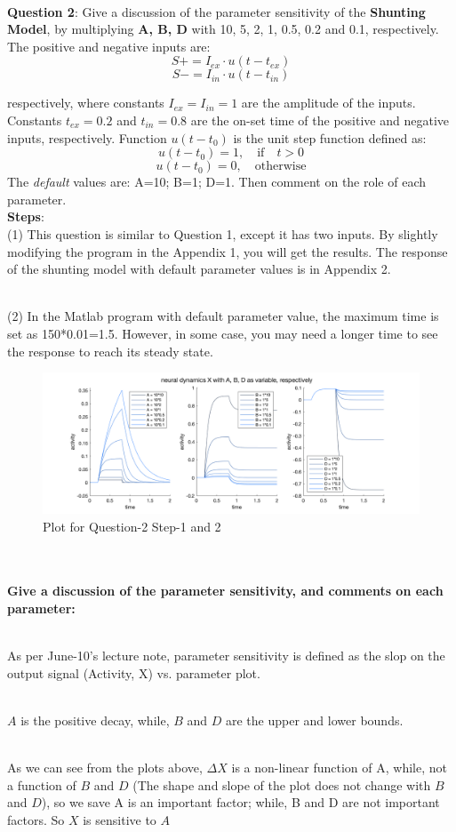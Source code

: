 \\
\clearpage
\pagebreak
\textbf{Question 2}: Give a discussion of the parameter sensitivity of the \textbf{Shunting Model}, by multiplying\textbf{ A, B, D} with 10, 5, 2, 1, 0.5, 0.2 and 0.1, respectively. The positive and negative inputs are:
\[S+ = I_{ex} \cdot u(t-t_{ex})\]
\[S- = I_{in} \cdot u(t-t_{in})\]

respectively, where constants $I_{ex} = I_{in} = 1$ are the amplitude of the inputs. Constants $t_{ex} = 0.2$ and $t_{in} = 0.8$ are the on-set time of the positive and negative inputs, respectively.
Function $u(t-t_0)$ is the unit step function defined as:
\[u(t- t_0) = 1, \quad \mathrm{if \quad} t>0\]
\[u(t- t_0) = 0, \quad \mathrm{otherwise}\] The \textit{default} values are: A=10; B=1; D=1. 
Then comment on the role of each parameter.
\\
\textbf{Steps}:
\\
(1) This question is similar to Question 1, except it has two inputs. By slightly modifying the program in the Appendix 1, you will get the results. The response of the shunting model with default parameter values is in Appendix 2.

\\
(2) In the Matlab program with default parameter value, the maximum time is set as 150*0.01=1.5. However, in some case, you may need a longer time to see the response to reach its steady state.


\begin{figure}[h!]
    \centering
    \includegraphics[scale=0.30]{picture/q2-1.png}
    \caption{Plot for Question-2 Step-1 and 2}
    \label{fig:my_label7}
\end{figure}

\\
\\

\textbf{Give a discussion of the parameter sensitivity, and comments on each parameter:}

\\As per June-10's lecture note, parameter sensitivity is defined as the slop on the output signal (Activity, X) vs. parameter plot.

\\$A$ is the positive decay, while, $B$ and $D$ are the upper and lower bounds.

\\As we can see from the plots above, $\Delta X$ is a non-linear function of A, while, not a function of $B$ and $D$ (The shape and slope of the plot does not change with $B$ and $D$), so we save A is an important factor; while, B and D are not important factors. So $X$ is sensitive to $A$ 

